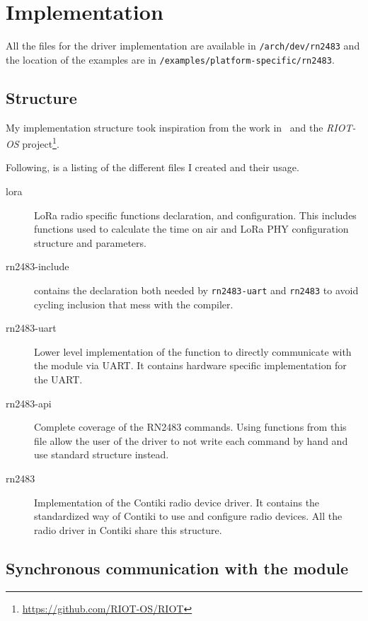 \section{Implementation}

All the files for the driver implementation are available in
\lstinline{/arch/dev/rn2483} and the location of the examples are in
\lstinline{/examples/platform-specific/rn2483}.

\subsection{Structure}

My implementation structure took inspiration from the work 
in~\cite{8847137} and the \emph{RIOT-OS}
project\footnote{\url{https://github.com/RIOT-OS/RIOT}}. 

Following, is a listing of the different files I created and their
usage.

\begin{description}
  \item[lora] LoRa radio specific functions declaration, and configuration. 
    This includes functions used to calculate the time on air and
    LoRa PHY configuration structure and parameters.
  \item[rn2483-include] contains the declaration both needed by
    \lstinline{rn2483-uart} and \lstinline{rn2483} to avoid cycling inclusion
    that mess with the compiler.
  \item[rn2483-uart] Lower level implementation of the function to directly
    communicate with the module via UART\@.
    It contains hardware specific implementation for the UART\@.
  \item[rn2483-api] Complete coverage of the RN2483 commands. Using functions
    from this file allow the user of the driver to not write
    each command by hand and use standard structure instead.
  \item[rn2483] Implementation of the Contiki radio device driver. 
    It contains the standardized way of Contiki to use and configure radio
    devices.
    All the radio driver in Contiki share this structure.
\end{description}

\subsection{Synchronous communication with the module}

